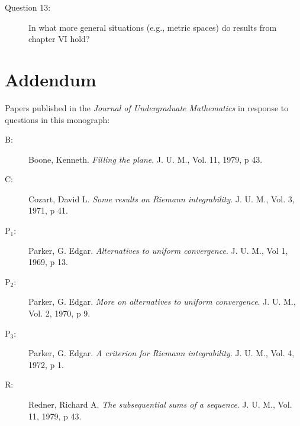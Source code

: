 \documentclass{article}
\begin{document}
\begin{description}

  \item[Question 13:] In what more general situations (e.g., metric spaces) do results from chapter VI hold?

\end{description}



\newpage

\section*{Addendum}

Papers published in the \emph{Journal of Undergraduate Mathematics} in response to questions in this monograph:

\begin{description}
  \item[B:] Boone, Kenneth. \emph{Filling the plane}. J. U. M., Vol. 11, 1979, p 43.
  \item[C:] Cozart, David L. \emph{Some results on Riemann integrability}. J. U. M., Vol. 3, 1971, p 41.
  \item[P$_1$:] Parker, G. Edgar. \emph{Alternatives to uniform convergence}. J. U. M., Vol 1, 1969, p 13.
  \item[P$_2$:] Parker, G. Edgar. \emph{More on alternatives to uniform convergence}. J. U. M., Vol. 2, 1970, p 9.
  \item[P$_3$:] Parker, G. Edgar. \emph{A criterion for Riemann integrability}. J. U. M., Vol. 4, 1972, p 1.
  \item[R:] Redner, Richard A. \emph{The subsequential sums of a sequence}. J. U. M., Vol. 11, 1979, p 43.
\end{description}
\end{document}
